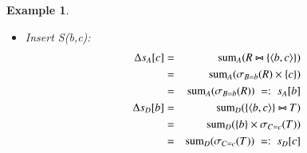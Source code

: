\documentclass{article}
\newtheorem{example}[theorem]{Example}
\newcommand{\tuple}[1]{{\langle#1\rangle}}
\begin{document}
\begin{example}
\begin{itemize}
Derivation with current rules:
\begin{eqnarray*}
\algnew_{+R(a,b)} s_A[\rho_{B}(R)] &=&
(\algnew_{+R(a,b)} \algsum_{A}(\sigma_{R.B=x}(R)))[x=\algnew_{+R(a,b)} \rho_{B}(R)]
\\
&\stackrel{(\ref{eq:agg2}), (\ref{eq:a5}), (\ref{eq:b6}), (\ref{eq:b1})}{=}& 
(\algincr_{+, s_A[x]}  \algsum_{A}
(\sigma_{R.B=x}(\pi_{a \rightarrow R.A, b \rightarrow R.B}\{<>\})))
[x = \algnew_{+R(a,b)} \rho_{B}(R)]
\\
&\stackrel{(\ref{eq:md4}), (\ref{eq:fs2}), (\ref{eq:ags1})^*, (\ref{eq:ags2})^*}{=}&
\algfor(x \in B) \; \{ \; \mathrm{ignore}((\algupdate_{+, s_{A}[x]}
\algsum_{A}
(\sigma_{R.B=x}(\pi_{a \rightarrow R.A, b \rightarrow R.B}\{<>\})))[x]) \; \};
\\
&& rc = b;
\\
&& \mbox{if ($s_A$.find($rc$) = $s_A$.end)}
\; \{ \; \mathrm{ignore}((\alginsert_{s_{A}[rc]} a)[rc]) \; \};
\\
&& s_{A}[rc]
\\
&=&
\mbox{if ($s_A$.find(b) != $s_A$.end)} \; \{ \; \algupdate_{+,s_A[b]} a \; \}
\\
&& \mbox{else } \; \{ \; \alginsert_{s_A[b]} a \; \}
\\
&\dots& \mbox{Note the for loop is only valid when $x = b$}
%
%
\\[2ex]
\algnew_{+R(a,b)} s_A[\rho_{C}(S)] &=&
(\algnew_{+R(a,b)} \algsum_A (R \times \sigma_{S.C=x}(S)))[x = \algnew_{+R(a,b)} \rho_{C}(S)]
\\
&\stackrel{(\ref{eq:md4}), (\ref{eq:agg2}), (\ref{eq:a5}), (\ref{eq:b6}), (\ref{eq:b1})}
{\stackrel{(\ref{eq:ags1}), (\ref{eq:ags2}), (\ref{eq:sum3})}{=}}&
\algfor(x \in C) \; \\
&& \qquad \mathrm{ignore}((\algupdate_{+, s_{A}[x]}
a * \algsum_{1}
(\sigma_{S.C=x}(S)))[x]);\\
&\dots& \mbox{Note $rc = null$, thus no return value.}
\end{eqnarray*}

(Analogously insert T(c,d) for maintaining $s_{D}[b], s_{D}[c]$.)

\item
Insert S(b,c):
\begin{eqnarray*}
\Delta s_A[c] &=&
\algsum_{A}(R \bowtie \{\tuple{b,c}\})
\\ &=&
\algsum_{A}(\sigma_{B=b}(R) \times \{c\})
\\ &=&
\algsum_{A}(\sigma_{B=b}(R))
\;=:\; s_A[b]
\\
\Delta s_D[b] &=&
\algsum_{D}(\{\tuple{b,c}\} \bowtie T)
\\ &=&
\algsum_{D}(\{b\} \times \sigma_{C=c}(T))
\\ &=&
\algsum_{D}(\sigma_{C=c}(T))
\;=:\; s_D[c]
\end{eqnarray*}
\end{itemize}


\end{example}
\end{document}
